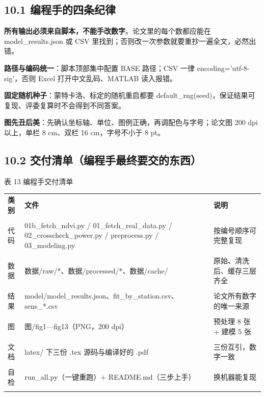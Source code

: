 \documentclass[11pt,a4paper]{ctexart}
\begin{document}
\subsection*{10.1 编程手的四条纪律}
\textbf{所有输出必须来自脚本，不能手改数字}。论文里的每个数都应能在 model\_results.json 或 CSV 里找到；否则改一次参数就要重抄一遍全文，必然出错。

\textbf{路径与编码统一}：脚本顶部集中配置 BASE 路径；CSV 一律 encoding='utf-8-sig'，否则 Excel 打开中文乱码、MATLAB 读入报错。

\textbf{固定随机种子}：蒙特卡洛、标定的随机重启都要 default\_rng(seed)，保证结果可复现、评委复算时不会得到不同答案。

\textbf{图先丑后美}：先确认坐标轴、单位、图例正确，再调配色与字号；论文图 200 dpi 以上，单栏 8 cm、双栏 16 cm，字号不小于 8 pt。


\subsection*{10.2 交付清单（编程手最终要交的东西）}
表 13  编程手交付清单


\begin{table}[H]\centering\small\setlength{\parskip}{2pt}
\begin{tabularx}{\textwidth}{|X|X|X|}
\toprule
\textbf{类别} & \textbf{文件} & \textbf{说明} \\\\
\midrule
代码 & 01b\_fetch\_ndvi.py / 01\_fetch\_real\_data.py / 02\_crosscheck\_power.py / preprocess.py / 03\_modeling.py & 按编号顺序可完整复现 \\\\
数据 & 数据/raw/*、数据/processed/*、数据/cache/ & 原始、清洗后、缓存三层齐全 \\\\
结果 & model/model\_results.json、fit\_by\_station.csv、sens\_*.csv & 论文所有数字的唯一来源 \\\\
图 & 图/fig1—fig13（PNG，200 dpi） & 预处理 8 张 + 建模 5 张 \\\\
文档 & latex/ 下三份 .tex 源码与编译好的 .pdf & 三份互引，数字一致 \\\\
自检 & run\_all.py（一键重跑）+ README.md（三步上手） & 换机器能复现 \\\\
\bottomrule
\end{tabularx}
\end{table}
\end{document}
